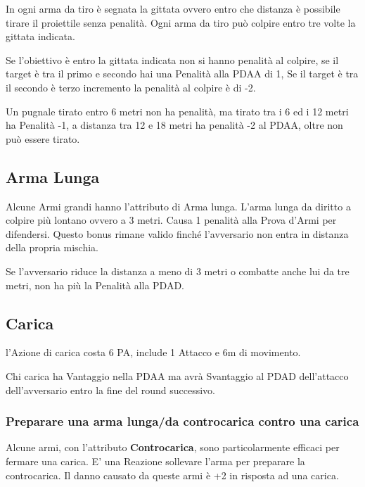 \documentclass[12pt,a4paper,twoside,openany]{book}
\begin{document}
\begin{multicols}{2}
In ogni arma da tiro è segnata la gittata ovvero entro che distanza è possibile tirare il proiettile senza penalità. Ogni arma da tiro può colpire entro tre volte la gittata indicata.

Se l'obiettivo è entro la gittata indicata non si hanno penalità al colpire, se il target è tra il primo e secondo hai una Penalità alla PDAA di 1, Se il target è tra il secondo è terzo incremento la penalità al colpire è di -2.

Un pugnale tirato entro 6 metri non ha penalità, ma tirato tra i 6 ed i 12 metri ha Penalità -1, a distanza tra 12 e 18 metri ha penalità -2 al PDAA, oltre non può essere tirato.

\subsection{Arma Lunga} \label{armalunga}

Alcune Armi grandi hanno l'attributo di Arma lunga. L'arma lunga da diritto a colpire più lontano ovvero a 3 metri. Causa 1 penalità alla Prova d'Armi per difendersi. Questo bonus rimane valido finché l'avversario non entra in distanza della propria mischia.

Se l'avversario riduce la distanza a meno di 3 metri o combatte anche lui da tre metri, non ha più la Penalità alla PDAD.

\subsection{Carica} \label{carica}

l'Azione di carica costa 6 PA, include 1 Attacco e 6m di movimento.

Chi carica ha Vantaggio nella PDAA ma avrà Svantaggio al PDAD dell'attacco dell'avversario entro la fine del round successivo.

\subsubsection{Preparare una arma lunga/da controcarica contro una carica} \label{prepararearmalungacontrocarica}

Alcune armi, con l'attributo \textbf{Controcarica}, sono particolarmente efficaci per fermare una carica. E' una Reazione sollevare l'arma per preparare la controcarica. Il danno causato da queste armi è +2 in risposta ad una carica.


\end{multicols}
\end{document}
